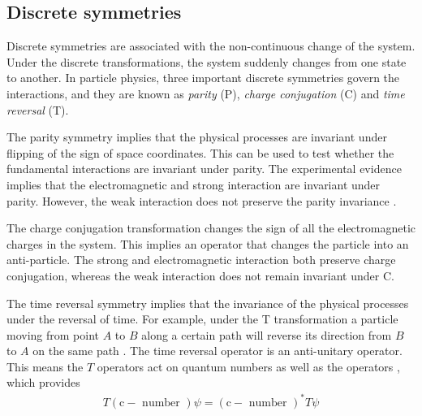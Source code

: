 \subsection{Discrete symmetries}
Discrete symmetries are associated with the non-continuous change of the system. Under the discrete transformations, the system suddenly changes from one state to another. In particle physics, three important discrete symmetries govern the interactions, and they are known as \textit{parity} (P), \textit{charge conjugation} (C) and \textit{time reversal} (T).\par
The parity symmetry implies that the physical processes are invariant under flipping of the sign of space coordinates. This can be used to test whether the fundamental interactions are invariant under parity. The experimental evidence implies that the electromagnetic and strong interaction are invariant under parity. However, the weak interaction does not preserve the parity invariance \cite{Lee:1956qn}. \par
The charge conjugation transformation changes the sign of all the electromagnetic charges in the system. This implies an operator that changes the particle into an anti-particle. The strong and electromagnetic interaction both preserve charge conjugation, whereas the weak interaction does not remain invariant under C.\par
The time reversal symmetry implies that the invariance of the physical processes under the reversal of time. For example, under the T transformation a particle moving from point $A$ to $B$ along a certain path will reverse its direction from $B$ to $A$ on the same path \cite{Peccei:1998jv}. The time reversal operator is an anti-unitary operator. This means the $T$ operators act on quantum numbers as well as the operators \cite{Peskin:1995ev}, which provides
\begin{eqnarray}
T(\mathrm{c}-\text { number })\psi=(\mathrm{c}-\text { number })^{*} T\psi
\end{eqnarray}
